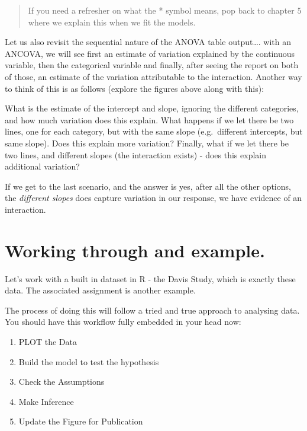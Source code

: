 \documentclass[
]{book}
\providecommand{\tightlist}{%
  \setlength{\itemsep}{0pt}\setlength{\parskip}{0pt}}
\begin{document}
\begin{quote}
If you need a refresher on what the * symbol means, pop back to chapter 5 where we explain this when we fit the models.
\end{quote}

Let us also revisit the sequential nature of the ANOVA table output\ldots. with an ANCOVA, we will see first an estimate of variation explained by the continuous variable, then the categorical variable and finally, after seeing the report on both of those, an estimate of the variation attributable to the interaction. Another way to think of this is as follows (explore the figures above along with this):

What is the estimate of the intercept and slope, ignoring the different categories, and how much variation does this explain.
What happens if we let there be two lines, one for each category, but with the same slope (e.g.~different intercepts, but same slope). Does this explain more variation?
Finally, what if we let there be two lines, and different slopes (the interaction exists) - does this explain additional variation?

If we get to the last scenario, and the answer is yes, after all the other options, the \emph{different slopes} does capture variation in our response, we have evidence of an interaction.

\hypertarget{working-through-and-example.}{%
\section{Working through and example.}\label{working-through-and-example.}}

Let's work with a built in dataset in R - the Davis Study, which is exactly these data. The associated assignment is another example.

The process of doing this will follow a tried and true approach to analysing data. You should have this workflow fully embedded in your head now:

\begin{enumerate}
\def\labelenumi{\arabic{enumi})}
\tightlist
\item
  PLOT the Data
\item
  Build the model to test the hypothesis
\item
  Check the Assumptions
\item
  Make Inference
\item
  Update the Figure for Publication
\end{enumerate}
\end{document}
